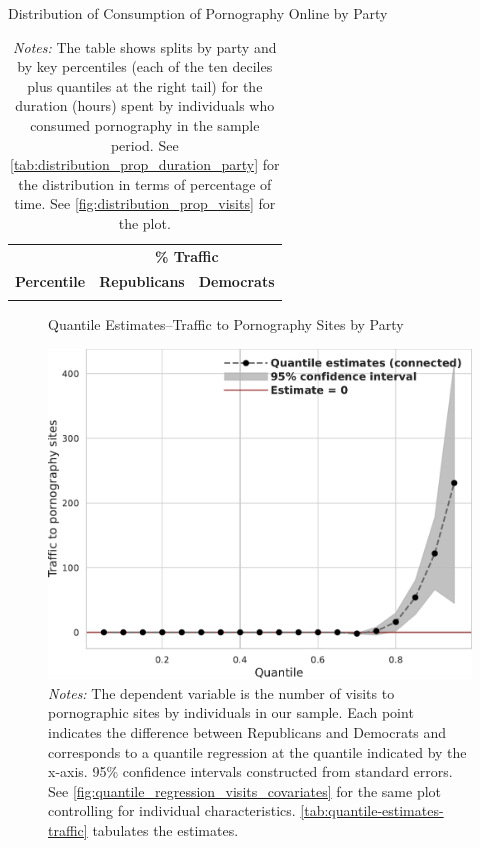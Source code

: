 \documentclass[12pt,twoside]{article}
\begin{document}
\begin{table}[ht] \centering \small \setlength\tabcolsep{10 pt}
	\caption{Distribution of Consumption of Pornography Online by Party}
	\label{tab:distribution_prop_visits_party}
	\begin{adjustbox}{max width=\textwidth}
		\begin{tabular}{crr}
			\toprule
			\multicolumn{1}{l}{\textbf{}}&\multicolumn{2}{c}{\textbf{\% Traffic}}\\
			\cmidrule(l){2-3}
			\multicolumn{1}{l}{\textbf{Percentile}}&\multicolumn{1}{c}{\textbf{Republicans}}&\multicolumn{1}{c}{\textbf{Democrats}}\\
			\midrule
            \\
			\bottomrule
		\end{tabular}
	\end{adjustbox}
	\caption*{\footnotesize \emph{Notes:} 
		The table shows splits by party and by key percentiles (each of the ten deciles plus quantiles at the right tail) for the duration (hours) spent by individuals who consumed pornography in the sample period. 
		See \cref{tab:distribution_prop_duration_party} for the distribution in terms of percentage of time. 
		See \cref{fig:distribution_prop_visits} for the plot.
	}
\end{table}

\FloatBarrier
\begin{figure}
	\centering
	\caption{Quantile Estimates--Traffic to Pornography Sites by Party}
	\includegraphics[width=.55\linewidth]{figs/quantile_reg_visits_adult.pdf}
	\caption*{\footnotesize \emph{Notes:} 
		The dependent variable is the number of visits to pornographic sites by individuals in our sample.
		Each point indicates the difference between Republicans and Democrats and corresponds to a quantile regression at the quantile indicated by the x-axis.
		95\% confidence intervals constructed from standard errors.
		See \cref{fig:quantile_regression_visits_covariates} for the same plot controlling for individual characteristics.
            \cref{tab:quantile-estimates-traffic} tabulates the estimates.
	}
	\label{fig:quantile_regression_visits}
\end{figure}
\end{document}
